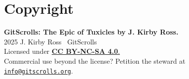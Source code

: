 \chapter*{Copyright}

{\noindent\textbf{GitScrolls: The Epic of Tuxicles by J. Kirby Ross.}\\
\textcopyright{} 2025 J. Kirby Ross \textbullet\ GitScrolls\\
Licensed under \href{https://creativecommons.org/licenses/by-nc-sa/4.0/}{\textbf{CC BY-NC-SA 4.0}.}\\
Commercial use beyond the license? Petition the steward at \href{mailto:info@gitscrolls.org}{\nolinkurl{info@gitscrolls.org}}.}
